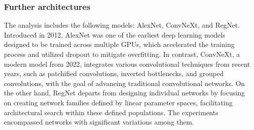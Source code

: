 




\FloatBarrier


\subsubsection{Further architectures}

The analysis includes the following models: AlexNet, ConvNeXt, and RegNet. Introduced in 2012, AlexNet was one of the earliest deep learning models designed to be trained across multiple GPUs, which accelerated the training process and utilized dropout to mitigate overfitting. In contrast, ConvNeXt, a modern model from 2022, integrates various convolutional techniques from recent years, such as patchified convolutions, inverted bottlenecks, and grouped convolutions, with the goal of advancing traditional convolutional networks. On the other hand, RegNet departs from designing individual networks by focusing on creating network families defined by linear parameter spaces, facilitating architectural search within these defined populations. The experiments encompassed networks with significant variations among them.


